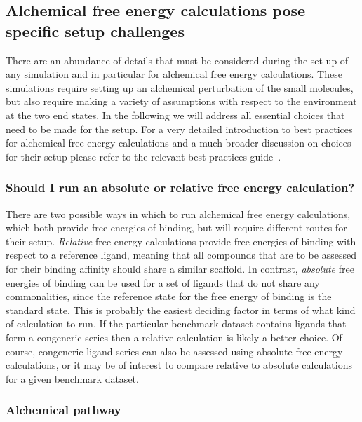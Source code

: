 \documentclass[9pt,bestpractices,pubversion]{livecoms}
\begin{document}
\subsection{Alchemical free energy calculations pose specific setup challenges}
\label{sec:alchemical_prep}

There are an abundance of details that must be considered during the set up of any simulation and in particular for alchemical free energy calculations. These simulations require setting up an alchemical perturbation of the small molecules, but also require making a variety of  assumptions with respect to the environment at the two end states. In the following we will address all essential choices that need to be made for the setup. For a very detailed introduction to best practices for alchemical free energy calculations and a much broader discussion on choices for their setup please refer to the relevant best practices guide~\cite{meyBestPracticesAlchemical2020}. 

\subsubsection{Should I run an absolute or relative free energy calculation?}
There are two possible ways in which to run alchemical free energy calculations, which both provide free energies of binding, but will require different routes for their setup. \textit{Relative} free energy calculations provide free energies of binding with respect to a reference ligand, meaning that all compounds that are to be assessed for their binding affinity should share a similar scaffold. In contrast, \textit{absolute} free energies of binding can be used for a set of ligands that do not share any commonalities, since the reference state for the free energy of binding is the standard state. This is probably the easiest deciding factor in terms of what kind of calculation to run. If the particular benchmark dataset contains ligands that form a congeneric series then a relative calculation is likely a better choice. Of course, congeneric ligand series can also be assessed using absolute free energy calculations, or it may be of interest to compare relative to absolute calculations for a given benchmark dataset. 


\subsubsection{Alchemical pathway}
\end{document}
